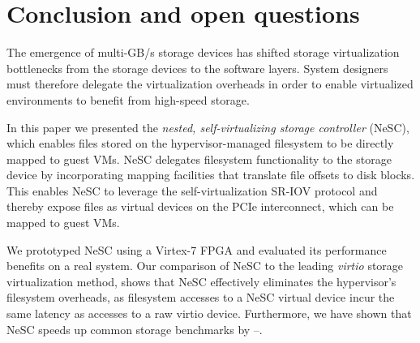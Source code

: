 
\chapter{Conclusion and open questions}
\label{chap:conclusion}

The emergence of multi-GB/s storage devices has shifted storage virtualization bottlenecks from the storage devices to the software layers. System designers must therefore delegate the virtualization overheads in order to enable virtualized environments to benefit from high-speed storage. 

In this paper we presented the \emph{nested, self-virtualizing storage controller} (NeSC), which enables files stored on the hypervisor-managed filesystem to be directly mapped to guest VMs. NeSC delegates filesystem functionality to the storage device by incorporating mapping facilities that translate file offsets to disk blocks. This enables NeSC to leverage the self-virtualization SR-IOV protocol and thereby expose files as virtual devices on the PCIe interconnect, which can be mapped to guest VMs.

We prototyped NeSC using a Virtex-7 FPGA and evaluated its performance benefits on a real system. Our comparison of NeSC to the leading \emph{virtio} storage virtualization method, shows that NeSC effectively eliminates the hypervisor's filesystem overheads, as filesystem accesses to a NeSC virtual device incur the same latency as accesses to a raw virtio device.
Furthermore, we have shown that NeSC speeds up common storage benchmarks by --.

